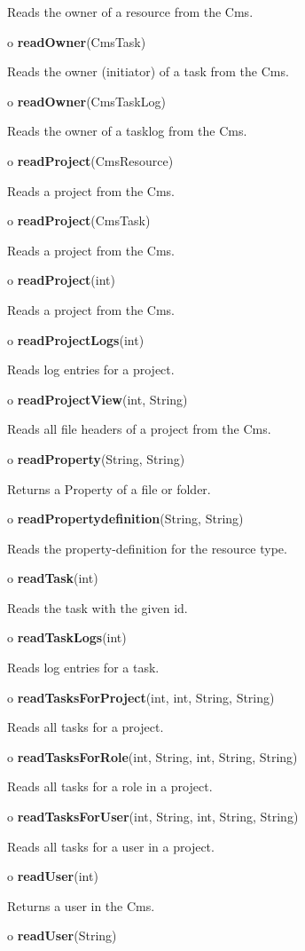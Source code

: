 \begin{description}
Reads the owner of a resource from the Cms.  
\item o {\bf readOwner}(CmsTask)  

Reads the owner (initiator) of a task from the Cms.  
\item o {\bf readOwner}(CmsTaskLog)  

Reads the owner of a tasklog from the Cms.  
\item o {\bf readProject}(CmsResource)  

Reads a project from the Cms.  
\item o {\bf readProject}(CmsTask)  

Reads a project from the Cms.  
\item o {\bf readProject}(int)  

Reads a project from the Cms.  
\item o {\bf readProjectLogs}(int)  

Reads log entries for a project.  
\item o {\bf readProjectView}(int, String)  

Reads all file headers of a project from the Cms.  
\item o {\bf readProperty}(String, String)  

Returns a Property of a file or folder.  
\item o {\bf readPropertydefinition}(String, String)  

Reads the property-definition for the resource type.  
\item o {\bf readTask}(int)  

Reads the task with the given id.  
\item o {\bf readTaskLogs}(int)  

Reads log entries for a task.  
\item o {\bf readTasksForProject}(int, int, String, String)  

Reads all tasks for a project.  
\item o {\bf readTasksForRole}(int, String, int, String, String)  

Reads all tasks for a role in a project.  
\item o {\bf readTasksForUser}(int, String, int, String, String)  

Reads all tasks for a user in a project.  
\item o {\bf readUser}(int)  

Returns a user in the Cms.  
\item o {\bf readUser}(String)  


\end{description}
